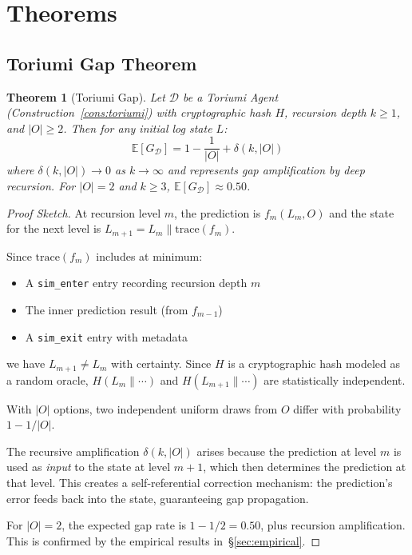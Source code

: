 \documentclass[12pt,a4paper]{article}
\newtheorem{theorem}{Theorem}[section]
\theoremstyle{definition}
\theoremstyle{remark}
\newcommand{\cD}{\mathcal{D}}
\newcommand{\E}{\mathbb{E}}
\begin{document}
\section{Theorems}

\subsection{Toriumi Gap Theorem}

\begin{theorem}[Toriumi Gap]\label{thm:gap}
Let $\cD$ be a Toriumi Agent (Construction~\ref{cons:toriumi}) with
cryptographic hash $H$, recursion depth $k \geq 1$, and $|O| \geq 2$.
Then for any initial log state $L$:
\begin{equation}
\E[G_{\cD}] = 1 - \frac{1}{|O|} + \delta(k, |O|)
\end{equation}
where $\delta(k, |O|) \to 0$ as $k \to \infty$ and represents gap amplification
by deep recursion. For $|O| = 2$ and $k \geq 3$, $\E[G_{\cD}] \approx 0.50$.
\end{theorem}

\begin{proof}[Proof Sketch]
At recursion level $m$, the prediction is $f_m(L_m, O)$ and the state for the
next level is $L_{m+1} = L_m \parallel \text{trace}(f_m)$.

Since $\text{trace}(f_m)$ includes at minimum:
\begin{itemize}[itemsep=0pt]
\item A \texttt{sim\_enter} entry recording recursion depth $m$
\item The inner prediction result (from $f_{m-1}$)
\item A \texttt{sim\_exit} entry with metadata
\end{itemize}
we have $L_{m+1} \neq L_m$ with certainty. Since $H$ is a cryptographic hash
modeled as a random oracle, $H(L_m \parallel \cdots)$ and $H(L_{m+1} \parallel
\cdots)$ are statistically independent.

With $|O|$ options, two independent uniform draws from $O$ differ with
probability $1 - 1/|O|$.

The recursive amplification $\delta(k, |O|)$ arises because the prediction at
level $m$ is used as \emph{input} to the state at level $m+1$, which then
determines the prediction at that level. This creates a self-referential
correction mechanism: the prediction's error feeds back into the state,
guaranteeing gap propagation.

For $|O| = 2$, the expected gap rate is $1 - 1/2 = 0.50$, plus recursion
amplification. This is confirmed by the empirical results in~\S\ref{sec:empirical}.
\end{proof}
\end{document}
